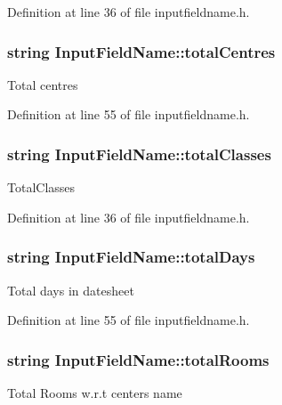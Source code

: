 Definition at line 36 of file inputfieldname.\-h.

\hypertarget{classInputFieldName_af88ac102ec3a4adbb9edc7c3d61919cb}{
\subsubsection[{total\-Centres}]{\setlength{\rightskip}{0pt plus 5cm}string Input\-Field\-Name\-::total\-Centres}}\label{classInputFieldName_af88ac102ec3a4adbb9edc7c3d61919cb}
Total centres 

Definition at line 55 of file inputfieldname.\-h.

\hypertarget{classInputFieldName_a5bf413dee6dcf29c1872e93f150d48c0}{
\subsubsection[{total\-Classes}]{\setlength{\rightskip}{0pt plus 5cm}string Input\-Field\-Name\-::total\-Classes}}\label{classInputFieldName_a5bf413dee6dcf29c1872e93f150d48c0}
Total\-Classes 

Definition at line 36 of file inputfieldname.\-h.

\hypertarget{classInputFieldName_a12ba65660edd7f8f7ecf1e25893716da}{
\subsubsection[{total\-Days}]{\setlength{\rightskip}{0pt plus 5cm}string Input\-Field\-Name\-::total\-Days}}\label{classInputFieldName_a12ba65660edd7f8f7ecf1e25893716da}
Total days in datesheet 

Definition at line 55 of file inputfieldname.\-h.

\hypertarget{classInputFieldName_a51fe8230341d7863ffd4672f2c986beb}{
\subsubsection[{total\-Rooms}]{\setlength{\rightskip}{0pt plus 5cm}string Input\-Field\-Name\-::total\-Rooms}}\label{classInputFieldName_a51fe8230341d7863ffd4672f2c986beb}
Total Rooms w.\-r.\-t centers name 

